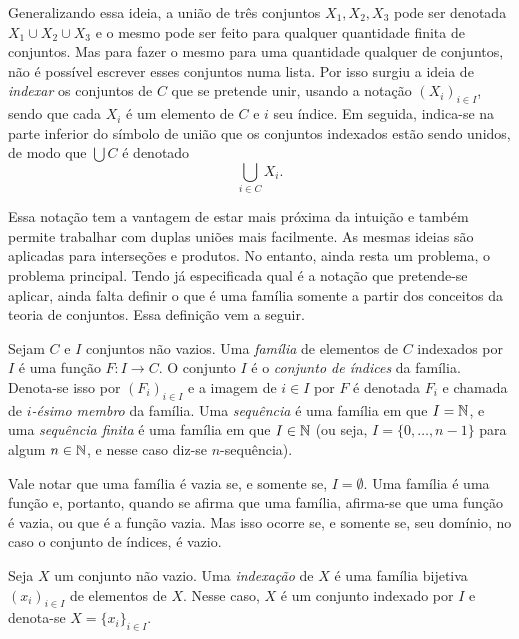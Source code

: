 Generalizando essa ideia, a união de três conjuntos $X_1,X_2,X_3$ pode ser denotada $X_1 \cup X_2 \cup X_3$ e o mesmo pode ser feito para qualquer quantidade finita de conjuntos. Mas para fazer o mesmo para uma quantidade qualquer de conjuntos, não é possível escrever esses conjuntos numa lista. Por isso surgiu a ideia de \emph{indexar} os conjuntos de $C$ que se pretende unir, usando a notação $(X_i)_{i \in I}$, sendo que cada $X_i$ é um elemento de $C$ e $i$ seu índice. Em seguida, indica-se na parte inferior do símbolo de união que os conjuntos indexados estão sendo unidos, de modo que $\bigcup C$ é denotado
	\begin{equation*}
	\bigcup_{i \in C} X_i.
	\end{equation*}

Essa notação tem a vantagem de estar mais próxima da intuição e também permite trabalhar com duplas uniões mais facilmente. As mesmas ideias são aplicadas para interseções e produtos. No entanto, ainda resta um problema, o problema principal. Tendo  já especificada qual é a notação que pretende-se aplicar, ainda falta definir o que é uma família somente a partir dos conceitos da teoria de conjuntos. Essa definição vem a seguir.

\begin{defi}
Sejam $C$ e $I$ conjuntos não vazios. Uma \emph{família} de elementos de $C$ indexados por $I$ é uma função $F: I \to C$. O conjunto $I$ é o \emph{conjunto de índices} da família. Denota-se isso por $(F_i)_{i \in I}$ e a imagem de $i \in I$ por $F$ é denotada $F_i$ e chamada de \emph{$i$-ésimo membro} da família.
\noindent
Uma \emph{sequência} é uma família em que $I=\mathbb{N}$, e uma \emph{sequência finita} é uma família em que $I \in \mathbb{N}$ (ou seja, $I=\{0,\ldots,n-1\}$ para algum $n \in \mathbb{N}$, e nesse caso diz-se $n$-sequência).
\end{defi}

Vale notar que uma família é vazia se, e somente se, $I=\emptyset$. Uma família é uma função e, portanto, quando se afirma que uma família, afirma-se que uma função é vazia, ou que é a função vazia. Mas isso ocorre se, e somente se, seu domínio, no caso o conjunto de índices, é vazio.

\begin{defi}
	Seja $X$ um conjunto não vazio. Uma \emph{indexação} de $X$ é uma família bijetiva $(x_i)_{i \in I}$ de elementos de $X$. Nesse caso, $X$ é um conjunto indexado por $I$ e denota-se $X=\{x_i\}_{i \in I}$.
\end{defi}

